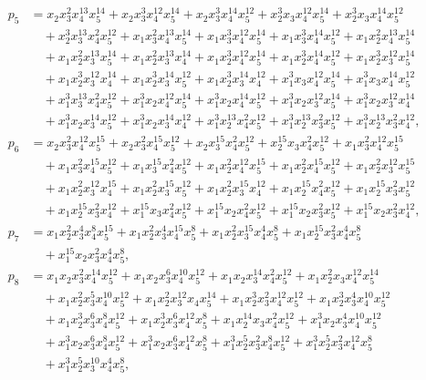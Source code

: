 \documentclass[reqno]{amsart}
\theoremstyle{plain}
\theoremstyle{definition}
\theoremstyle{plain}
\theoremstyle{definition}
\numberwithin{equation}{section}
\begin{document}
\begin{align*}
p_5 & = x_2x_3^{2}x_4^{13}x_5^{14} + x_2x_3^{3}x_4^{12}x_5^{14} + x_2x_3^{3}x_4^{14}x_5^{12} + x_2^{3}x_3x_4^{12}x_5^{14} + x_2^{3}x_3x_4^{14}x_5^{12}\\ &\quad + x_2^{3}x_3^{13}x_4^{2}x_5^{12} + x_1x_3^{2}x_4^{13}x_5^{14} + x_1x_3^{3}x_4^{12}x_5^{14} + x_1x_3^{3}x_4^{14}x_5^{12} + x_1x_2^{2}x_4^{13}x_5^{14}\\ &\quad + x_1x_2^{2}x_3^{13}x_5^{14} + x_1x_2^{2}x_3^{13}x_4^{14} + x_1x_2^{3}x_4^{12}x_5^{14} + x_1x_2^{3}x_4^{14}x_5^{12} + x_1x_2^{3}x_3^{12}x_5^{14}\\ &\quad + x_1x_2^{3}x_3^{12}x_4^{14} + x_1x_2^{3}x_3^{14}x_5^{12} + x_1x_2^{3}x_3^{14}x_4^{12} + x_1^{3}x_3x_4^{12}x_5^{14} + x_1^{3}x_3x_4^{14}x_5^{12}\\ &\quad + x_1^{3}x_3^{13}x_4^{2}x_5^{12} + x_1^{3}x_2x_4^{12}x_5^{14} + x_1^{3}x_2x_4^{14}x_5^{12} + x_1^{3}x_2x_3^{12}x_5^{14} + x_1^{3}x_2x_3^{12}x_4^{14}\\ &\quad + x_1^{3}x_2x_3^{14}x_5^{12} + x_1^{3}x_2x_3^{14}x_4^{12} + x_1^{3}x_2^{13}x_4^{2}x_5^{12} + x_1^{3}x_2^{13}x_3^{2}x_5^{12} + x_1^{3}x_2^{13}x_3^{2}x_4^{12},\\
p_6 &= x_2x_3^{2}x_4^{12}x_5^{15} + x_2x_3^{2}x_4^{15}x_5^{12} + x_2x_3^{15}x_4^{2}x_5^{12} + x_2^{15}x_3x_4^{2}x_5^{12} + x_1x_3^{2}x_4^{12}x_5^{15}\\ &\quad + x_1x_3^{2}x_4^{15}x_5^{12} + x_1x_3^{15}x_4^{2}x_5^{12} + x_1x_2^{2}x_4^{12}x_5^{15} + x_1x_2^{2}x_4^{15}x_5^{12} + x_1x_2^{2}x_3^{12}x_5^{15}\\ &\quad + x_1x_2^{2}x_3^{12}x_4^{15} + x_1x_2^{2}x_3^{15}x_5^{12} + x_1x_2^{2}x_3^{15}x_4^{12} + x_1x_2^{15}x_4^{2}x_5^{12} + x_1x_2^{15}x_3^{2}x_5^{12}\\ &\quad + x_1x_2^{15}x_3^{2}x_4^{12} + x_1^{15}x_3x_4^{2}x_5^{12} + x_1^{15}x_2x_4^{2}x_5^{12} + x_1^{15}x_2x_3^{2}x_5^{12} + x_1^{15}x_2x_3^{2}x_4^{12},\\
p_7 &= x_1x_2^{2}x_3^{4}x_4^{8}x_5^{15} + x_1x_2^{2}x_3^{4}x_4^{15}x_5^{8} + x_1x_2^{2}x_3^{15}x_4^{4}x_5^{8} + x_1x_2^{15}x_3^{2}x_4^{4}x_5^{8}\\ &\quad + x_1^{15}x_2x_3^{2}x_4^{4}x_5^{8},\\
p_8 &= x_1x_2x_3^{2}x_4^{14}x_5^{12} + x_1x_2x_3^{6}x_4^{10}x_5^{12} + x_1x_2x_3^{14}x_4^{2}x_5^{12} + x_1x_2^{2}x_3x_4^{12}x_5^{14}\\ &\quad + x_1x_2^{2}x_3^{5}x_4^{10}x_5^{12} + x_1x_2^{2}x_3^{12}x_4x_5^{14} + x_1x_2^{3}x_3^{2}x_4^{12}x_5^{12} + x_1x_2^{3}x_3^{4}x_4^{10}x_5^{12}\\ &\quad + x_1x_2^{3}x_3^{6}x_4^{8}x_5^{12} + x_1x_2^{3}x_3^{6}x_4^{12}x_5^{8} + x_1x_2^{14}x_3x_4^{2}x_5^{12} + x_1^{3}x_2x_3^{4}x_4^{10}x_5^{12}\\ &\quad + x_1^{3}x_2x_3^{6}x_4^{8}x_5^{12} + x_1^{3}x_2x_3^{6}x_4^{12}x_5^{8} + x_1^{3}x_2^{5}x_3^{2}x_4^{8}x_5^{12} + x_1^{3}x_2^{5}x_3^{2}x_4^{12}x_5^{8}\\ &\quad + x_1^{3}x_2^{5}x_3^{10}x_4^{4}x_5^{8},\\

\end{align*}
\end{document}
